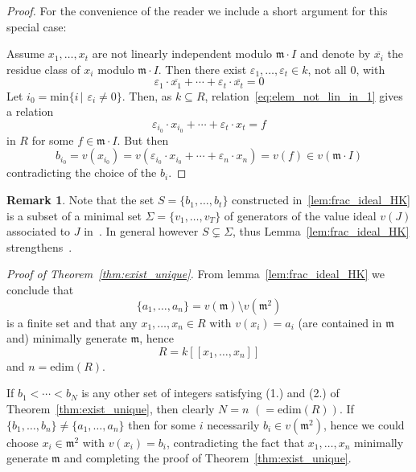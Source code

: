 \documentclass[12pt]{amsart}
\theoremstyle{plain}%
\theoremstyle{definition}
\newtheorem{notiz}{Remark}[section]
\renewcommand{\(}{\left(}
\renewcommand{\)}{\right)}
\begin{document}
\begin{proof}
For the convenience of the reader we include a short 
argument for this special case: 

Assume $x_1, \ldots , x_t$ are not linearly independent 
modulo $\mathfrak m \cdot I$ and denote by $\overline{x_i}$ 
the residue class of $x_i$ modulo $\mathfrak m \cdot I$. 
Then there exist $\varepsilon_1, \ldots, \varepsilon_t 
\in k$, not all $0$, with 
	\begin{equation}\label{eq:elem_not_lin_in_1} 
 	\varepsilon_1 \cdot \overline{x_1} + \cdots + 
    \varepsilon_t \cdot \overline{x_t} = 0 
	\end{equation}
Let $i_0 = \mathrm{min} \{ i \, \vert \,\, \varepsilon_i 
\neq 0 \}$. Then, as $k \subseteq R$, 
relation~\eqref{eq:elem_not_lin_in_1} gives a relation 
	\begin{equation}\label{eq:elem_not_lin_in_2} 
 	\varepsilon_{i_0} \cdot x_{i_0} + \cdots + \varepsilon_t 
    \cdot x_t = f
	\end{equation}
in $R$ for some $f \in \mathfrak m \cdot I$. But then 
	$$ b_{i_0} = v(x_{i_0}) = v(\varepsilon_{i_0} \cdot 
    x_{i_0} + \cdots + \varepsilon_n \cdot x_n) = v(f) 
    \in v(\mathfrak m \cdot I) $$
contradicting the choice of the $b_i$. 
\end{proof}

\begin{notiz}
Note that the set $S = \{b_1, \ldots, b_t\}$ constructed 
in~\ref{lem:frac_ideal_HK} is a subset of a minimal set 
$\Sigma = \{v_1, \ldots, v_T\}$ of generators of the value  
ideal $v(J)$ associated to $J$ in~\cite[\S 2]{HK}. In 
general however $S \subsetneq \Sigma$, thus 
Lemma~\ref{lem:frac_ideal_HK} strengthens~\cite[2.6]{HK}. 
\end{notiz}

\medbreak

\noindent\textit{Proof of Theorem~\ref{thm:exist_unique}.} 
From lemma~\ref{lem:frac_ideal_HK} we conclude that 
	$$ \{a_1, \ldots, a_n\} = v(\mathfrak m) \setminus 
    v(\mathfrak m^2) $$
is a finite set and that any $x_1, \ldots, x_n \in R$ with 
$v(x_i) = a_i$ (are contained in $\mathfrak m$ and) 
minimally generate $\mathfrak m$, hence 
	$$ R = k[[x_1, \ldots, x_n ]] $$ 
and $n = \mathrm{edim}(R)$. 

If $b_1 < \cdots < b_N$ is any other set of integers 
satisfying (1.) and (2.) of Theorem~\ref{thm:exist_unique}, 
then clearly $N = n \,\, (= \mathrm{edim}(R))$. 
If $\{b_1, \ldots , b_n\} \neq \{a_1, \ldots, a_n\}$ then 
for some $i$ necessarily $b_i \in v(\mathfrak m^2)$, hence 
we could choose $x_i \in \mathfrak m^2$ with 
$v(x_i) = b_i$, contradicting the fact that $x_1,\ldots,x_n$ 
minimally generate $\mathfrak m$ and completing the proof of 
Theorem~\ref{thm:exist_unique}. 
\end{document}

